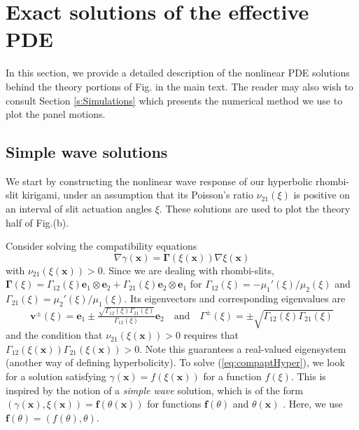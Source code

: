 \documentclass[aps,11pt,tightenlines,notitlepage,superscriptaddress,longbibliography,nofootinbib]{revtex4-1}
\begin{document}
 





\section{Exact solutions of the effective PDE}

In this section, we provide a detailed description of the  nonlinear PDE solutions behind the theory portions of Fig. in the main text. The reader may also wish to consult Section \ref{s:Simulations} which presents the numerical method we use to plot the panel motions.

\subsection{Simple wave solutions}
We start by constructing the nonlinear wave response of our hyperbolic rhombi-slit kirigami, under an assumption that its Poisson's ratio $\nu_{21}(\xi)$ is positive on an interval of slit actuation angles $\xi$. These solutions are used to plot the theory half of Fig.(b).

Consider solving the compatibility equations
\begin{equation}\label{eq:compaptHyper}
\nabla \gamma(\mathbf{x}) = \boldsymbol{\Gamma}(\xi(\mathbf{x})) \nabla \xi(\mathbf{x})
\end{equation}
with $\nu_{21}(\xi(\mathbf{x})) > 0$. Since we are dealing with rhombi-slits, $\boldsymbol{\Gamma}(\xi) = \Gamma_{12}(\xi) \mathbf{e}_1 \otimes \mathbf{e}_2 + \Gamma_{21}(\xi) \mathbf{e}_2 \otimes \mathbf{e}_1$ for  $\Gamma_{12}(\xi)  = -\mu_1'(\xi)/\mu_{2}(\xi)$ and $\Gamma_{21}(\xi) = \mu_2'(\xi)/ \mu_1(\xi)$. Its eigenvectors and corresponding eigenvalues are
\begin{equation}
    \label{eq:eigen}
    \mathbf{v}^{\pm}(\xi) = \mathbf{e}_1  \pm \tfrac{\sqrt{\Gamma_{12}(\xi)\Gamma_{21}(\xi)}}{\Gamma_{12}(\xi)}\mathbf{e}_2\quad\text{and}\quad  
   \Gamma^{\pm}(\xi) = \pm \sqrt{\Gamma_{12}(\xi) \Gamma_{21}(\xi)}
\end{equation}
and the condition that $\nu_{21}(\xi(\mathbf{x}))>0$ requires that $\Gamma_{12}(\xi(\mathbf{x})) \Gamma_{21}(\xi(\mathbf{x})) > 0$. Note this guarantees a real-valued eigensystem (another way of defining hyperbolicity). 
To solve (\ref{eq:compaptHyper}), we look for a solution satisfying $\gamma(\mathbf{x}) = f(\xi(\mathbf{x}))$ for a function $f(\xi)$. This is inspired by the notion of a  \textit{simple wave} solution, which is of the  form $(\gamma(\mathbf{x}),\xi(\mathbf{x})) = \mathbf{f}(\theta(\mathbf{x}))$ for functions $\mathbf{f}(\theta)$ and $\theta(\mathbf{x})$ \cite[Ch..1]{evans10}. Here, we use  $\mathbf{f}(\theta)=(f(\theta),\theta)$. 
\end{document}
